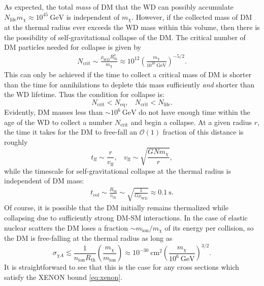 \documentclass[preprintnumbers,amsmath,amssymb,prd,superscriptaddress]{revtex4}
\newcommand{\OO}{\mathcal{O}}
\newcommand{\GeV}{\text{GeV}}
\newcommand{\cm}{\text{cm}}
\def\r{\right)}
\def\l{\left(}
\begin{document}
As expected, the total \emph{mass} of DM that the WD can possibly accumulate $N_\text{life} m_\chi \approx 10^{45} ~\GeV$ is independent of $m_\chi$. 
However, if the collected mass of DM at the thermal radius ever exceeds the WD mass within this volume, then there is the possibility of self-gravitational collapse of the DM.
The critical number of DM particles needed for collapse is given by
\begin{align}
\label{eq:Ncore}
    N_\text{crit} \sim \frac{\rho_\text{WD} R^3_\text{th}}{m_\chi} \approx 10^{12} \l \frac{m_\chi}{10^{16} ~\GeV} \r^{-5/2}.
\end{align}
This can only be achieved if the time to collect a critical mass of DM is shorter than the time for annihilations to deplete this mass sufficiently \emph{and} shorter than the WD lifetime. 
Thus the condition for collapse is:
\begin{equation}
\label{eq:collapsecondition}
N_\text{crit} < N_\text{eq}, ~~~~ N_\text{crit} < N_\text{life}. 
\end{equation}
Evidently, DM masses less than $\sim 10^{6} ~\GeV$ do not have enough time within the age of the WD to collect a number $N_\text{crit}$ and begin a collapse.
At a given radius $r$, the time it takes for the DM to free-fall an $\OO(1)$ fraction of this distance is roughly
\begin{equation}
\label{eq:freefalltime}
t_\text{ff} \sim \frac{r}{v_\text{ff}}, ~~~~ v_\text{ff} \sim \sqrt{\frac{G N m_\chi}{r}},
\end{equation}
while the timescale for self-gravitational collapse at the thermal radius is independent of DM mass:
\begin{align}
\label{eq:collapsetime}
  t_\text{col} \sim \frac{R_\text{th}}{v_\text{th}} \sim \sqrt{\frac{1}{G \rho_\text{WD}}} \approx 0.1 ~\text{s}.
\end{align}
Of course, it is possible that the DM initially remains thermalized while collapsing due to sufficiently strong DM-SM interactions. 
In the case of elastic nuclear scatters the DM loses a fraction $\sim m_\text{ion}/m_\chi$ of its energy per collision, so the DM is free-falling at the thermal radius as long as
\begin{equation}
\sigma_{\chi A} \lesssim \frac{1}{n_\text{ion} R_\text{th}} \l \frac{m_\chi}{m_\text{ion}}\r \approx 10^{-30} ~\cm^2 \l \frac{m_\chi}{10^6 ~\GeV} \r^{3/2}.
\end{equation}
It is straightforward to see that this is the case for any cross sections which satisfy the XENON bound \eqref{eq:xenon}.
\end{document}
